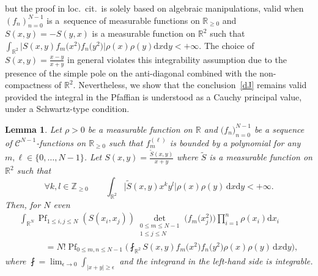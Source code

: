 \documentclass[10pt,a4paper]{amsart}
\numberwithin{equation}{section}
\newcommand{\dd}{\mathrm{d}}
\newtheorem{Lemma}[Theorem]{Lemma}
\begin{document}
but the proof in loc.\ cit.\ is solely based on algebraic manipulations, valid when $(f_n)_{n = 0}^{N - 1}$ is a~sequence of measurable functions on $\mathbb{R}_{\geq 0}$ and $S(x,y) = -S(y,x)$ is a measurable function on $\mathbb{R}^2$ such that $\int_{\mathbb{R}^2} \big|S(x,y)f_m\bigl(x^2\bigr)f_n\bigl(y^2\bigr)\big|\rho(x)\rho(y)\dd x\dd y < +\infty$. The choice of $S(x,y) = \frac{x - y}{x + y}$ in general violates this integrability assumption due to the presence of the simple pole on the anti-diagonal combined with the non-compactness of $\mathbb{R}^2$. Nevertheless, we show that the conclusion~\eqref{dJ} remains valid provided the integral in the Pfaffian is understood as a Cauchy principal value, under a Schwartz-type condition.

\begin{Lemma}
\label{HUHH}Let $\rho > 0$ be a measurable function on $\mathbb{R}$ and $\mathbb(f_n)_{n = 0}^{N - 1}$ be a sequence of $\mathcal{C}^{N - 1}$-functions on $\mathbb{R}_{\geq 0}$ such that $f^{(\ell)}_m$ is bounded by a polynomial for any $m,\ell \in \{0,\dots,N - 1\}$. Let $S(x,y) = \frac{\tilde{S}(x,y)}{x + y}$ where $\tilde{S}$ is a measurable function on $\mathbb{R}^2$ such that
\[
\forall k,l \in \mathbb{Z}_{\geq 0}\qquad \int_{\mathbb{R}^2} \bigl|\tilde{S}(x,y)x^ky^l\bigr|\rho(x)\rho(y)\,\dd x \dd y < +\infty.
\]
Then, for $N$ even
\begin{gather*}
 \int_{\mathbb{R}^N} \operatorname{Pf}_{1 \leq i,j \leq N} (S(x_i,x_j)) \mathop{\det}_{\substack{0 \leq m \leq N - 1 \\
 1 \leq j \leq N}} \bigl(f_m\bigl(x_j^2\bigr)\bigr) \prod_{i = 1}^n \rho(x_i)\dd x_i \\
\qquad\quad{} = N!\operatorname{Pf}_{0 \leq m,n \leq N - 1}\biggl(\fint_{\mathbb{R}^2} S(x,y) f_m\bigl(x^2\bigr) f_n\bigl(y^2\bigr)\rho(x)\rho(y)\,\dd x \dd y\biggr),
\end{gather*}
where $\fint = \lim_{\epsilon \rightarrow 0} \int_{|x + y| \geq \epsilon}$ and the integrand in the left-hand side is integrable.
\end{Lemma}
\end{document}
